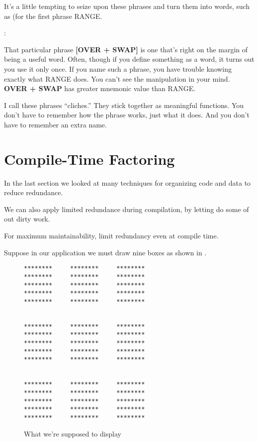 It's a little tempting to seize upon these phrases and turn them into words, such as (for the first phrase RANGE.

\begin{interview}
:

\begin{tfquot}
That particular phrase \textbf{[OVER + SWAP]} is one that's right on the margin of being a useful word. Often, though if you define something as a word, it turns out you use it only once. If you name such a phrase, you have trouble knowing exactly what RANGE does. You can't see the manipulation in your mind. \textbf{OVER + SWAP} has greater mnemonic value than RANGE.
\end{tfquot}
\end{interview}
I call these phrases ``cliches.'' They stick together as meaningful functions. You don't have to remember how the phrase works, just what it does. And you don't have to remember an extra name.

\section{{Compile-Time Factoring}}

\noindent
In the last section we looked at many techniques for organizing code and data to reduce redundance.

We can also apply limited redundance during compilation, by letting \Forth{} do some of out dirty work.

\begin{tip}
For maximum maintainability, limit redundancy even at compile time.
\end{tip}
Suppose in our application we must draw nine boxes as shown in .

\begin{figure*}[hhhh]
\caption{What we're supposed to display}
\begin{center}
\begin{BVerbatim}[baselinestretch=0.7]
********     ********     ********
********     ********     ********
********     ********     ********
********     ********     ********
********     ********     ********


********     ********     ********
********     ********     ********
********     ********     ********
********     ********     ********
********     ********     ********


********     ********     ********
********     ********     ********
********     ********     ********
********     ********     ********
********     ********     ********
\end{BVerbatim}
\end{center}
\end{figure*}

